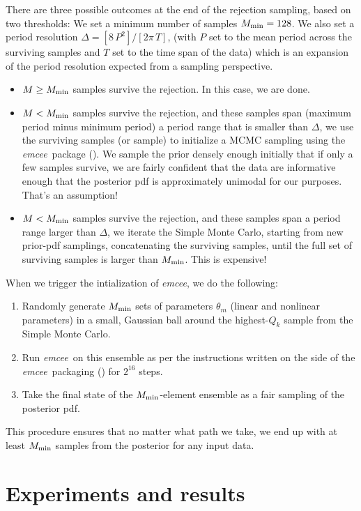\documentclass[12pt, preprint]{aastex}
\newcommand{\project}[1]{\textsl{#1}}
\newcommand{\emcee}{\project{emcee}}
\begin{document}
There are three possible outcomes at the end of the rejection
sampling, based on two thresholds:
We set a minimum number of samples $M_{\rm min}=128$.
We also set a period resolution $\Delta = [8\,P^2] / [2\pi\,T]$, (with
$P$ set to the mean period across the surviving samples and $T$ set to
the time span of the data) which is an expansion of the period
resolution expected from a sampling perspective.
\begin{itemize}
\item $M\geq M_{\rm min}$ samples survive the rejection.
  In this case, we are done.
\item $M<M_{\rm min}$ samples survive the rejection, and these samples
  span (maximum period minus minimum period) a period range that is
  smaller than $\Delta$, we use the surviving samples (or sample) to
  initialize a MCMC sampling using the \emcee\ package (\citealt{emcee}). We sample the
  prior densely enough initially that if only a few samples survive,
  we are fairly confident that the data are informative enough that
  the posterior pdf is approximately unimodal for our purposes. That's
  an assumption!
\item $M<M_{\rm min}$ samples survive the rejection, and these samples
  span a period range larger than $\Delta$, we iterate the Simple
  Monte Carlo, starting from new prior-pdf samplings, concatenating
  the surviving samples, until the full set of surviving samples is
  larger than $M_{\rm min}$. This is expensive!
\end{itemize}
When we trigger the intialization of \emcee, we do the following:
\begin{enumerate}
\item Randomly generate $M_{\rm min}$ sets of parameters $\theta_m$
  (linear and nonlinear parameters) in a small, Gaussian ball around
  the highest-$Q_k$ sample from the Simple Monte Carlo.
\item Run \emcee\ on this ensemble as per the instructions written on
  the side of the \emcee\ packaging (\citealt{emcee}) for $2^16$ steps.
\item Take the final state of the $M_{\rm min}$-element ensemble as a
  fair sampling of the posterior pdf.
\end{enumerate}
This procedure ensures that no matter what path we take, we end up with
at least $M_{\rm min}$ samples from the posterior for any input data.

\section{Experiments and results}
\end{document}
